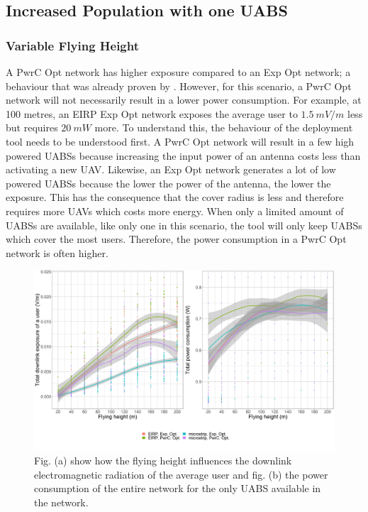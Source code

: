 \documentclass[twocolumn]{phdsymp} %
\begin{document}

\subsection{Increased Population with one UABS}
\subsubsection{Variable Flying Height}
A \gls{PwrC Opt} network has higher exposure compared to an \gls{Exp Opt} network; a behaviour that was already proven by \cite{J1}. 
However, for this scenario, a \gls{PwrC Opt} network will not necessarily result in a lower power consumption. 
For example, at 100 metres, an \gls{EIRP} \gls{Exp Opt} network exposes the average 
user to $1.5\ mV/m$ less but requires $20\ mW$ more.
To understand this, the behaviour of the deployment tool needs to be understood first. 
A \gls{PwrC Opt} network will result in a few high powered \gls{UABS}s because increasing the input power of an antenna costs 
less than activating a new  \gls{UAV}. Likewise, an \gls{Exp Opt} network 
generates a lot of low powered \gls{UABS}s because the lower the power of the antenna, the lower the exposure. This has the consequence that the cover radius 
is less and therefore requires more \gls{UAV}s which costs more energy.
When only a limited amount of \gls{UABS}s are available, 
like only one in this scenario, the tool will only keep \gls{UABS}s which cover the most users. 
Therefore, the power consumption in a \gls{PwrC Opt} network is often higher. 
\begin{figure}[h!]
  \includegraphics[width=\linewidth]{fhvsdlAndPc_extendedAbstract.png}
  \caption{Fig. (a) show how the flying height influences the downlink electromagnetic radiation of the average user and fig. (b) the
  power consumption of the entire network for the only \acs{UABS} available in the network.}
  \label{fig:s2a_dlAndPc}
\end{figure}
\end{document}
